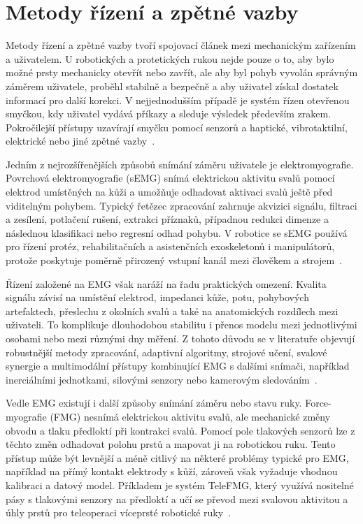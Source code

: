 \documentclass[FZS,DP]{tulthesis}
\begin{document}
\section{Metody řízení a zpětné vazby}

Metody řízení a zpětné vazby tvoří spojovací článek mezi mechanickým zařízením a uživatelem. U robotických a protetických rukou nejde pouze o to, aby bylo možné prsty mechanicky otevřít nebo zavřít, ale aby byl pohyb vyvolán správným záměrem uživatele, proběhl stabilně a bezpečně a aby uživatel získal dostatek informací pro další korekci. V nejjednodušším případě je systém řízen otevřenou smyčkou, kdy uživatel vydává příkazy a sleduje výsledek především zrakem. Pokročilejší přístupy uzavírají smyčku pomocí senzorů a haptické, vibrotaktilní, elektrické nebo jiné zpětné vazby~\cite{Ninu2014,Trajlinek2021,Tchimino2022920}.

Jedním z nejrozšířenějších způsobů snímání záměru uživatele je elektromyografie. Povrchová elektromyografie (sEMG) snímá elektrickou aktivitu svalů pomocí elektrod umístěných na kůži a umožňuje odhadovat aktivaci svalů ještě před viditelným pohybem. Typický řetězec zpracování zahrnuje akvizici signálu, filtraci a zesílení, potlačení rušení, extrakci příznaků, případnou redukci dimenze a následnou klasifikaci nebo regresní odhad pohybu. V robotice se sEMG používá pro řízení protéz, rehabilitačních a asistenčních exoskeletonů i manipulátorů, protože poskytuje poměrně přirozený vstupní kanál mezi člověkem a strojem~\cite{Song2023823,Sul2025627}.

Řízení založené na EMG však naráží na řadu praktických omezení. Kvalita signálu závisí na umístění elektrod, impedanci kůže, potu, pohybových artefaktech, přeslechu z okolních svalů a také na anatomických rozdílech mezi uživateli. To komplikuje dlouhodobou stabilitu i přenos modelu mezi jednotlivými osobami nebo mezi různými dny měření. Z tohoto důvodu se v literatuře objevují robustnější metody zpracování, adaptivní algoritmy, strojové učení, svalové synergie a multimodální přístupy kombinující EMG s dalšími snímači, například inerciálními jednotkami, silovými senzory nebo kamerovým sledováním~\cite{Sul2025627,Song2023823,Xiong2024}.

Vedle EMG existují i další způsoby snímání záměru nebo stavu ruky. Force-myografie (FMG) nesnímá elektrickou aktivitu svalů, ale mechanické změny obvodu a tlaku předloktí při kontrakci svalů. Pomocí pole tlakových senzorů lze z těchto změn odhadovat polohu prstů a mapovat ji na robotickou ruku. Tento přístup může být levnější a méně citlivý na některé problémy typické pro EMG, například na přímý kontakt elektrody s kůží, zároveň však vyžaduje vhodnou kalibraci a datový model. Příkladem je systém TeleFMG, který využívá nositelné pásy s tlakovými senzory na předloktí a učí se převod mezi svalovou aktivitou a úhly prstů pro teleoperaci víceprsté robotické ruky~\cite{Mizrahi2023}.
\end{document}

